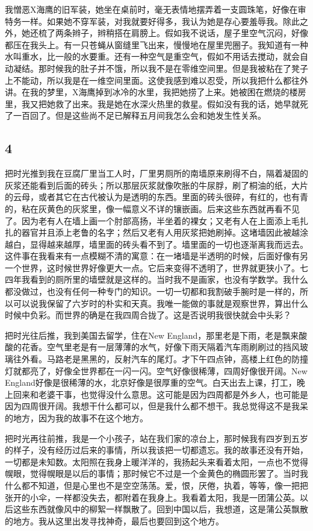 我憎恶X海鹰的旧军装，她坐在桌前时，毫无表情地摆弄着一支圆珠笔，好像在审特务一样。如果她不穿军装，对我就要好得多，我认为她是存心要羞辱我。除此之外，她还梳了两条辫子，辫稍搭在肩膀上。假如我不说话，屋子里空气沉闷，好像都压在我头上。有一只苍蝇从窗缝里飞出来，慢慢地在屋里兜圈子。我知道有一种水叫重水，比一般的水要重。还有一种空气是重空气，假如不用话去搅动，就会自动凝结。那时候我的肚子并不饿，所以我不是在零维空间里。但是我被粘在了凳子上不能动，所以我是在一维空间里面。这使我感到难以忍受，所以我把什么都往外讲。在我的梦里，X海鹰掉到冰冷的水里，我把她捞了上来。她被困在燃烧的楼房里，我又把她救了出来。我是她在水深火热里的救星。假如没有我的话，她早就死了一百回了。但是这些尚不足已解释五月间我怎么会和她发生性关系。 

\subsection{4} 

把时光推到我在豆腐厂里当工人时，厂里男厕所的南墙原来刷得不白，隔着凝固的灰浆还能看到后面的砖头；所以那层灰浆就像吹胀的牛尿脬，刷了桐油的纸，大片的云母，或者其它在古代被认为是透明的东西。里面的砖头很碎，有红的，也有青的，粘在灰黄色的灰浆里，像一幅意义不详的镶嵌画。后来这些东西就再看不见了。因为老有人在墙上画一个肘部高扬，半坐着的裸女；又老有人在上面添上毛扎扎的器官并且添上老鲁的名字；然后又老有人用灰浆把她刷掉。这堵墙因此被越涂越白，显得越来越厚，墙里面的砖头看不到了。墙里面的一切也逐渐离我而远去。这件事在我看来有一点模糊不清的寓意：在一堵墙是半透明的时候，后面好像有另一个世界，这时候世界好像更大一点。它后来变得不透明了，世界就更狭小了。七四年我看到的厕所里的墙壁就是这样的。当时我不是画家，也没有学数学。我什么都没做过，也没有任何一种专门的知识。一切一切都和我割破手腕时是一样的，所以可以说我保留了六岁时的朴实和天真。我唯一能做的事就是观察世界，算出什么时候中负彩。而世界的确是在我四周合拢了。这是否说明我很快就会中头彩？ 

把时光往后推，我到美国去留学，住在New England，那里老是下雨，老是飘来酸酸的花香。空气里老是有一层薄薄的水气，好像下雨天隔着汽车雨刷刷过的挡风玻璃往外看。马路老是黑黑的，反射汽车的尾灯。才下午四点钟，高楼上红色的防撞灯就都亮了，好像全世界都在一闪一闪。空气好像很稀薄，四周好像很开阔。New England好像是很稀薄的水，北京好像是很厚重的空气。白天出去上课，打工，晚上回来和老婆干事，也觉得没什么意思。这可能是因为四周都是外乡人，也可能是因为四周很开阔。我想干什么都可以，但是我什么都不想干。我总觉得这不是我呆的地方，因为我的故事不在这个地方。 

把时光再往前推，我是一个小孩子，站在我们家的凉台上，那时候我有四岁到五岁的样子，没有经历过后来的事情，所以我该把一切都遗忘。我的故事还没有开始，一切都是未知数。太阳照在我身上暖洋洋的，我扬起头来看着太阳，一点也不觉得幌眼，觉得幌眼是以后的事情；那时候它不过是一个金黄色的椭圆形罢了。当时我什么都不知道，但是心里也不是空空荡荡。爱，恨，厌倦，执着，等等，像一把把张开的小伞，一样都没失去，都附着在我身上。我看着太阳，我是一团蒲公英。以后这些东西就像风中的柳絮一样飘散了。回到中国以后，我想道，这是蒲公英飘散的地方。我从这里出发寻找神奇，最后也要回到这个地方。 

